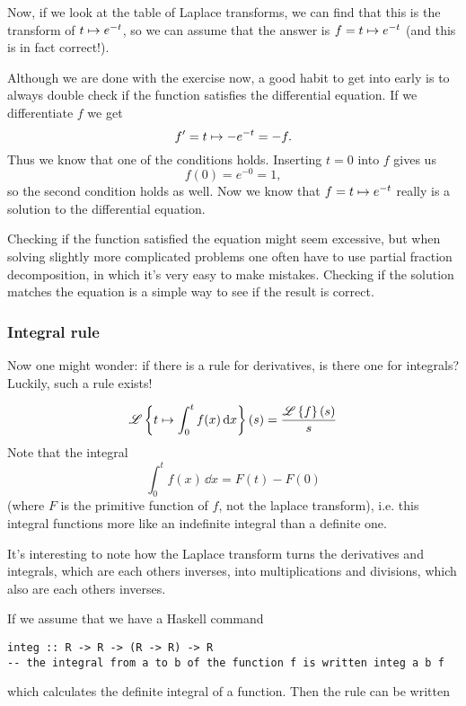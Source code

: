 \begin{solution}
Now, if we look at the table of Laplace transforms, we can find that this is the transform of $ t \mapsto e^{-t}$, so we can assume that the answer is $f =  t \mapsto e^{-t}$ (and this is in fact correct!).

Although we are done with the exercise now, a good habit to get into early is to always double check if the function satisfies the differential equation. If we differentiate $f$ we get
\begin{equation*}
    f' =  t \mapsto -e^{-t} = - f.
\end{equation*}
Thus we know that one of the conditions holds. Inserting $t=0$ into $f$ gives us 
\begin{equation*}
    f(0) = e^{-0} = 1,
\end{equation*}
so the second condition holds as well. Now we know that $f =  t \mapsto e^{-t}$ really is a solution to the differential equation. 

Checking if the function satisfied the equation might seem excessive, but when solving slightly more complicated problems one often have to use partial fraction decomposition, in which it's very easy to make mistakes. Checking if the solution matches the equation is a simple way to see if the result is correct. 
\end{solution}


\subsubsection{Integral rule} 
Now one might wonder: if there is a rule for derivatives, is there one for integrals? Luckily, such a rule exists! 

\begin{equation*}
    \mathscr{L} \left\{  t \mapsto \int_0^t f(x)\, \dd x\right\}(s) = \frac{\mathscr{L} \left\{f\right\}(s)}{s}
\end{equation*}
Note that the integral 
\begin{equation*}
    \int_0^t f(x)\, \dd x = F(t) - F(0) 
\end{equation*}
(where $F$ is the primitive function of $f$, not the laplace transform), i.e. this integral functions more like an indefinite integral than a definite one. 


It's interesting to note how the Laplace transform turns the derivatives and integrals, which are each others inverses, into multiplications and divisions, which also are each others inverses. 

If we assume that we have a Haskell command 
\begin{verbatim}
integ :: R -> R -> (R -> R) -> R 
-- the integral from a to b of the function f is written integ a b f
\end{verbatim} 
which calculates the definite integral of a function. Then the rule can be written

